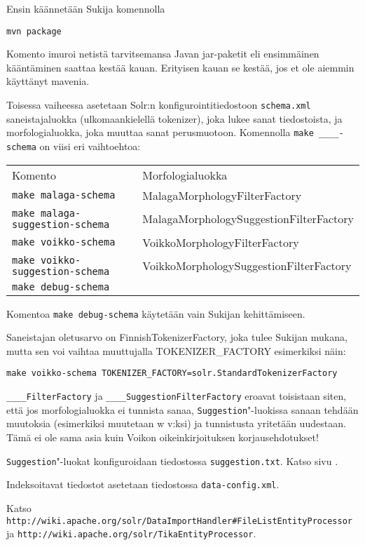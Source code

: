 \documentclass[12pt,a4paper]{scrartcl}
\begin{document}
Ensin käännetään Sukija komennolla

\verb=mvn package=

Komento imuroi netistä tarvitsemansa Javan jar-paketit eli ensimmäinen
kääntäminen saattaa kestää kauan. Erityisen kauan se kestää, jos et
ole aiemmin käyttänyt mavenia.

\bigskip Toisessa vaiheessa asetetaan Solr:n konfigurointitiedostoon
\verb=schema.xml= saneistajaluokka (ulkomaankielellä tokenizer), joka
lukee sanat tiedostoista, ja morfologialuokka, joka muuttaa sanat
perusmuotoon. Komennolla \verb|make ____-schema| on viisi eri
vaihtoehtoa:

\begin{tabular}{@{}ll}
Komento                              & Morfologialuokka \\
\verb=make malaga-schema=            & MalagaMorphologyFilterFactory \\
\verb=make malaga-suggestion-schema= & MalagaMorphologySuggestionFilterFactory \\
\verb=make voikko-schema=            & VoikkoMorphologyFilterFactory \\
\verb=make voikko-suggestion-schema= & VoikkoMorphologySuggestionFilterFactory \\
\verb=make debug-schema=             &
\end{tabular}

Komentoa \verb=make debug-schema= käytetään vain Sukijan
kehittämiseen.

Saneistajan oletusarvo on FinnishTokenizerFactory, joka tulee Sukijan
mukana, mutta sen voi vaihtaa muuttujalla TOKENIZER\_FACTORY
esimerkiksi näin:

\verb|make voikko-schema TOKENIZER_FACTORY=solr.StandardTokenizerFactory|

\verb=____FilterFactory= ja \verb=____SuggestionFilterFactory= eroavat
toisistaan siten, että jos morfologialuokka ei tunnista sanaa,
\verb=Suggestion="-luokissa sanaan tehdään muutoksia (esimerkiksi
muutetaan w v:ksi) ja tunnistusta yritetään uudestaan. Tämä ei ole
sama asia kuin Voikon oikeinkirjoituksen korjausehdotukset!

\verb=Suggestion="-luokat konfiguroidaan tiedostossa
\verb|suggestion.txt|. Katso sivu .

\bigskip
Indeksoitavat tiedostot asetetaan tiedostossa \verb|data-config.xml|.

Katso \\
\verb|http://wiki.apache.org/solr/DataImportHandler#FileListEntityProcessor| \\
ja
\verb|http://wiki.apache.org/solr/TikaEntityProcessor|.
\end{document}
